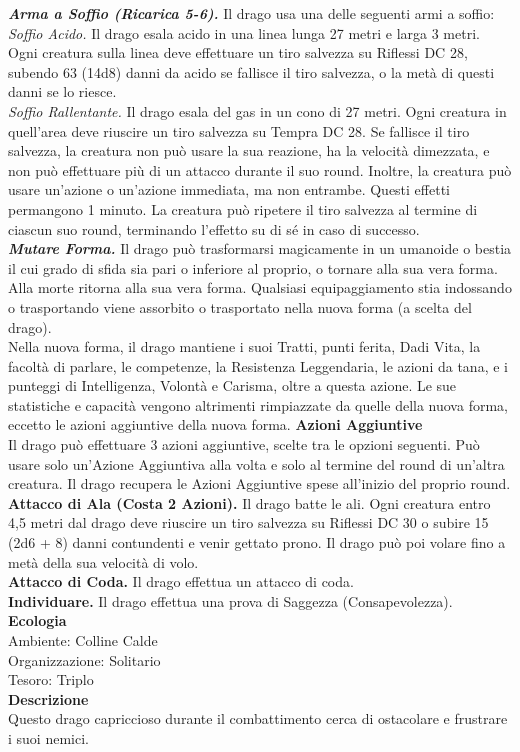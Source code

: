 \begin{multicols}{2}
\emph{\textbf{Arma a Soffio (Ricarica 5-6).}} Il drago usa una delle seguenti armi a soffio:\\
\emph{Soffio Acido.} Il drago esala acido in una linea lunga 27 metri e larga 3 metri. Ogni creatura sulla linea deve effettuare un tiro salvezza su Riflessi DC  28, subendo 63 (14d8) danni da acido se fallisce il tiro salvezza, o la metà di questi danni se lo riesce.\\
\emph{Soffio Rallentante.} Il drago esala del gas in un cono di 27 metri. Ogni creatura in quell'area deve riuscire un tiro salvezza su Tempra DC  28. Se fallisce il tiro salvezza, la creatura non può usare la sua reazione, ha la velocità dimezzata, e non può effettuare più di un attacco durante il suo round. Inoltre, la creatura può usare un'azione o un'azione immediata, ma non entrambe. Questi effetti permangono 1 minuto. La creatura può ripetere il tiro salvezza al termine di ciascun suo round, terminando l'effetto su di sé in caso di successo.\\
\emph{\textbf{Mutare Forma.}} Il drago può trasformarsi magicamente in un umanoide o bestia il cui grado di sfida sia pari o inferiore al proprio, o tornare alla sua vera forma. Alla morte ritorna alla sua vera forma. Qualsiasi equipaggiamento stia indossando o trasportando viene assorbito o trasportato nella nuova forma (a scelta del drago). \\
Nella nuova forma, il drago mantiene i suoi Tratti, punti ferita, Dadi Vita, la facoltà di parlare, le competenze, la Resistenza Leggendaria, le azioni da tana, e i punteggi di Intelligenza, Volontà e Carisma, oltre a questa azione. Le sue statistiche e capacità  vengono altrimenti rimpiazzate da quelle della nuova forma, eccetto le azioni aggiuntive della nuova forma.
\textbf{Azioni Aggiuntive}\\
Il drago può effettuare 3 azioni aggiuntive, scelte tra le opzioni seguenti. Può usare solo un'Azione Aggiuntiva alla volta e solo al termine del round di un'altra creatura. Il drago recupera le Azioni Aggiuntive spese all'inizio del proprio round.\\
\textbf{Attacco di Ala (Costa 2 Azioni).} Il drago batte le ali. Ogni creatura entro 4,5 metri dal drago deve riuscire un tiro salvezza su Riflessi DC  30 o subire 15 (2d6 + 8) danni contundenti e venir gettato prono. Il drago può poi volare fino a metà della sua velocità di volo.\\
\textbf{Attacco di Coda.} Il drago effettua un attacco di coda.\\
\textbf{Individuare.} Il drago effettua una prova di Saggezza (Consapevolezza).\\
\textbf{Ecologia}\\
Ambiente: Colline Calde\\
Organizzazione: Solitario\\
Tesoro: Triplo\\
\textbf{Descrizione}\\
Questo drago capriccioso durante il combattimento cerca di ostacolare e frustrare i suoi nemici.\\


\end{multicols}
